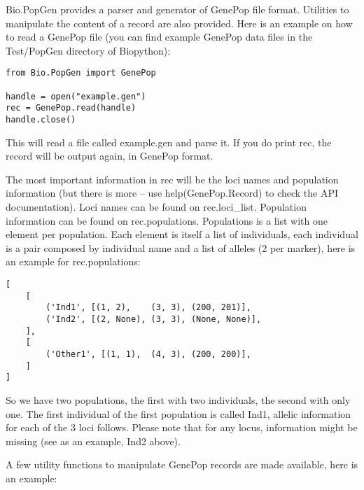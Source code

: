\documentclass{report}
\begin{document}
Bio.PopGen provides a parser and generator of GenePop file format.
Utilities to manipulate the content of a record are also provided.
Here is an example on how to read a GenePop file (you can find
example GenePop data files in the Test/PopGen directory of Biopython):

\begin{verbatim}
from Bio.PopGen import GenePop

handle = open("example.gen")
rec = GenePop.read(handle)
handle.close()
\end{verbatim}

This will read a file called example.gen and parse it. If you
do print rec, the record will be output again, in GenePop format.

The most important information in rec will be the loci names and
population information (but there is more -- use help(GenePop.Record)
to check the API documentation). Loci names can be found on rec.loci\_list.
Population information can be found on rec.populations.
Populations is a list with one element per population. Each element is itself
a list of individuals, each individual is a pair composed by individual
name and a list of alleles (2 per marker), here is an example for
rec.populations:

\begin{verbatim}
[
    [
        ('Ind1', [(1, 2),    (3, 3), (200, 201)],
        ('Ind2', [(2, None), (3, 3), (None, None)],
    ],
    [
        ('Other1', [(1, 1),  (4, 3), (200, 200)],
    ]
]
\end{verbatim}

So we have two populations, the first with two individuals, the
second with only one. The first individual of the first
population is called Ind1, allelic information for each of
the 3 loci follows. Please note that for any locus, information
might be missing (see as an example, Ind2 above).

A few utility functions to manipulate GenePop records are made
available, here is an example:
\end{document}
